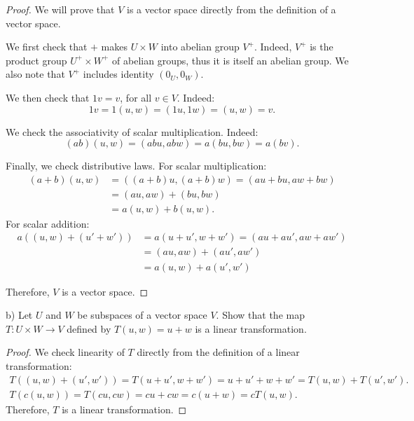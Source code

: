\documentclass{article}
\theoremstyle{definition}
\begin{document}
\begin{proof}

We will prove that $V$ is a vector space directly from the definition of a vector space.

We first check that $+$ makes $U \times W$ into abelian group $V^+$. Indeed, $V^+$ is the product group $U^+ \times W^+$ of abelian groups, thus it is itself an abelian group. We also note that $V^+$ includes identity $(0_U, 0_W)$.

We then check that $1v = v$, for all $v \in V$. Indeed:
\[ 1v = 1(u,w) = (1u,1w) = (u,w) = v. \]

We check the associativity of scalar multiplication. Indeed:
\[ (ab)(u,w) = (abu,abw) = a(bu,bw) = a(bv). \]

Finally, we check distributive laws. For scalar multiplication:
\begin{align*}
    (a+b)(u,w) & = ((a+b)u,(a+b)w) = (au+bu, aw+bw) \\
    & = (au,aw)+(bu,bw) \\
    & = a(u,w)+b(u,w).    
\end{align*}
For scalar addition:
\begin{align*}
    a((u,w)+(u'+w')) & = a(u+u',w+w') = (au+au',aw+aw') \\
    & = (au,aw)+(au',aw') \\
    & = a(u,w)+a(u',w')
\end{align*}

Therefore, $V$ is a vector space.

\end{proof}

\begin{tcolorbox}
b) Let $U$ and $W$ be subspaces of a vector space $V$.
Show that the map $T: U \times W \to V$ defined by $T(u,w) = u+w$ is a linear transformation.
\end{tcolorbox}

\begin{proof}

We check linearity of $T$ directly from the definition of a linear transformation:
\begin{gather*}
    T((u, w) + (u', w')) = T(u+u', w+w') = u+u'+w+w' 
    = T(u,w) + T(u',w'). \\
    T(c(u,w)) = T(cu,cw) = cu+cw = c(u+w) 
    = c T(u,w).
\end{gather*}
Therefore, $T$ is a linear transformation.

\end{proof}
\end{document}
